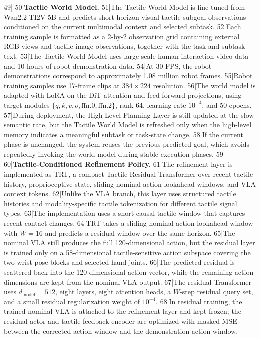 49|
50|\noindent\textbf{Tactile World Model.}
51|The Tactile World Model is fine-tuned from Wan2.2-TI2V-5B and predicts short-horizon visual-tactile subgoal observations conditioned on the current multimodal context and selected subtask.
52|Each training sample is formatted as a 2-by-2 observation grid containing external RGB views and tactile-image observations, together with the task and subtask text.
53|The Tactile World Model uses large-scale human interaction video data and 10 hours of robot demonstration data.
54|At 30 FPS, the robot demonstrations correspond to approximately 1.08 million robot frames.
55|Robot training samples use 17-frame clips at $384 \times 224$ resolution.
56|The world model is adapted with LoRA on the DiT attention and feed-forward projections, using target modules $\{q,k,v,o,\mathrm{ffn}.0,\mathrm{ffn}.2\}$, rank 64, learning rate $10^{-4}$, and 50 epochs.
57|During deployment, the High-Level Planning Layer is still updated at the slow semantic rate, but the Tactile World Model is refreshed only when the high-level memory indicates a meaningful subtask or task-state change.
58|If the current phase is unchanged, the system reuses the previous predicted goal, which avoids repeatedly invoking the world model during stable execution phases.
59|
60|\noindent\textbf{Tactile-Conditioned Refinement Policy.}
61|The refinement layer is implemented as TRT, a compact Tactile Residual Transformer over recent tactile history, proprioceptive state, sliding nominal-action lookahead windows, and VLA context tokens.
62|Unlike the VLA branch, this layer uses structured tactile histories and modality-specific tactile tokenization for different tactile signal types.
63|The implementation uses a short causal tactile window that captures recent contact changes.
64|TRT takes a sliding nominal-action lookahead window with $W=16$ and predicts a residual window over the same horizon.
65|The nominal VLA still produces the full 120-dimensional action, but the residual layer is trained only on a 58-dimensional tactile-sensitive action subspace covering the two wrist pose blocks and selected hand joints.
66|The predicted residual is scattered back into the 120-dimensional action vector, while the remaining action dimensions are kept from the nominal VLA output.
67|The residual Transformer uses $d_{\mathrm{model}}=512$, eight layers, eight attention heads, a $W$-step residual query set, and a small residual regularization weight of $10^{-4}$.
68|In residual training, the trained nominal VLA is attached to the refinement layer and kept frozen; the residual actor and tactile feedback encoder are optimized with masked MSE between the corrected action window and the demonstration action window.

